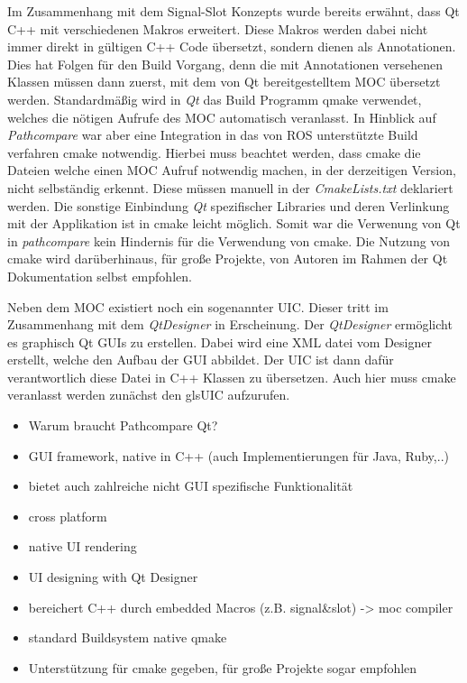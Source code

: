 Im Zusammenhang mit dem Signal-Slot Konzepts wurde bereits erwähnt, dass Qt C++
mit verschiedenen Makros erweitert. Diese Makros werden dabei nicht immer
direkt in gültigen C++ Code übersetzt, sondern dienen als Annotationen. Dies
hat Folgen für den Build Vorgang, denn die mit Annotationen versehenen Klassen
müssen dann zuerst, mit dem von Qt bereitgestelltem \gls{MOC} übersetzt werden.
Standardmäßig wird in \textit{Qt} das Build Programm qmake verwendet, welches
die nötigen Aufrufe des \gls{MOC} automatisch veranlasst. In Hinblick auf
\textit{Pathcompare} war aber eine Integration in das von \gls{ROS}
unterstützte Build verfahren cmake notwendig. Hierbei muss beachtet werden,
dass cmake die Dateien welche einen \gls{MOC} Aufruf notwendig machen, in der
derzeitigen Version, nicht selbständig erkennt. Diese müssen manuell in der
\textit{CmakeLists.txt} deklariert werden. Die sonstige Einbindung
\textit{Qt} spezifischer Libraries und deren Verlinkung mit der Applikation ist
in cmake leicht möglich. Somit war die Verwenung von Qt in
\textit{pathcompare} kein Hindernis für die Verwendung von cmake.
Die Nutzung von cmake wird darüberhinaus, für große Projekte, von Autoren im
Rahmen der Qt Dokumentation selbst empfohlen.

Neben dem \gls{MOC} existiert noch ein sogenannter \gls{UIC}. Dieser tritt im
Zusammenhang mit dem \textit{QtDesigner} in Erscheinung. Der
\textit{QtDesigner} ermöglicht es graphisch Qt GUIs zu erstellen. Dabei wird
eine XML datei vom Designer erstellt, welche den Aufbau der GUI abbildet.
Der UIC ist dann dafür verantwortlich diese Datei in C++ Klassen zu übersetzen.
Auch hier muss cmake veranlasst werden zunächst den gls{UIC} aufzurufen.

\begin{itemize}
  \item Warum braucht Pathcompare Qt?
  \item GUI framework, native in C++ (auch Implementierungen für Java, Ruby,..)
  \item bietet auch zahlreiche nicht GUI spezifische Funktionalität
  \item cross platform
  \item native UI rendering
  \item UI designing with Qt Designer
  \item bereichert C++ durch embedded Macros (z.B. signal\&slot) -> moc compiler
  \item standard Buildsystem native qmake 
  \item Unterstützung für cmake gegeben, für große Projekte sogar empfohlen
\end{itemize}


